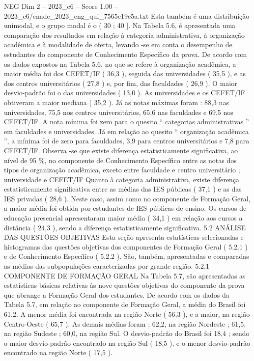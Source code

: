 \begin{textsample}{NEG Dim 2 – 2023\_c6 – Score 1.00 – 2023\_c6/enade\_2023\_eng\_qui\_7565c19e5a.txt}
Esta também é uma distribuição unimodal, e o grupo modal é o ( 30 ; 40 ].
Na Tabela 5.6, é apresentada uma comparação dos resultados em relação à categoria administrativa, à organização acadêmica e à modalidade de oferta, levando -se em conta o desempenho de estudantes do componente de Conhecimento Específico da prova.
De acordo com os dados expostos na Tabela 5.6, no que se refere à organização acadêmica, a maior média foi dos CEFET/IF ( 36,3 ), seguida das universidades ( 35,5 ), e as dos centros universitários ( 27,8 ) e, por fim, das faculdades ( 26,9 ).
O maior desvio-padrão foi o das universidades ( 13,0 ).
As universidades e os CEFET/IF obtiveram a maior mediana ( 35,2 ).
Já as notas máximas foram : 88,3 nas universidades, 75,5 nos centros universitários, 65,6 nas faculdades e 69,5 nos CEFET/IF.
A nota mínima foi zero para o quesito “ categorias administrativas ” em faculdades e universidades.
Já em relação ao quesito “ organização acadêmica ”, a mínima foi de zero para faculdades, 3,9 para centros universitários e 7,8 para CEFET/IF.
Observa -se que existe diferença estatisticamente significativa, ao nível de 95 \%, no componente de Conhecimento Específico entre as notas dos tipos de organização acadêmica, exceto entre faculdade e centro universitário ; universidade e CEFET/IF Quanto à categoria administrativa, existe diferença estatisticamente significativa entre as médias das IES públicas ( 37,1 ) e as das IES privadas ( 28,6 ).
Neste caso, assim como no componente de Formação Geral, a maior média foi obtida por estudantes de IES públicas de ensino.
Os cursos de educação presencial apresentaram maior média ( 34,1 ) em relação aos cursos a distância ( 24,3 ), sendo a diferença estatisticamente significativa. 5.2 ANÁLISE DAS QUESTÕES OBJETIVAS Esta seção apresenta estatísticas selecionadas e histogramas das questões objetivas dos componentes de Formação Geral ( 5.2.1 ) e de Conhecimento Específico ( 5.2.2 ).
São, também, apresentadas e comparadas as médias das subpopulações caracterizadas por grande região. 5.2.1 COMPONENTE DE FORMAÇÃO GERAL Na Tabela 5.7, são apresentadas as estatísticas básicas relativas às nove questões objetivas do componente da prova que abrange a Formação Geral dos estudantes.
De acordo com os dados da Tabela 5.7, em relação ao componente de Formação Geral, a média do Brasil foi 61,2.
A menor média foi encontrada na região Norte ( 56,3 ), e a maior, na região Centro-Oeste ( 65,7 ).
As demais médias foram : 62,2, na região Nordeste ; 61,5, na região Sudeste ; 60,0, na região Sul.
O desvio-padrão do Brasil foi 18,4 ; sendo o maior desvio-padrão encontrado na região Sul ( 18,5 ), e o menor desvio-padrão encontrado na região Norte ( 17,5 ).

\end{textsample}
